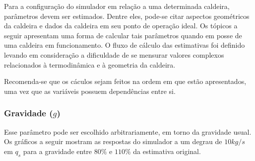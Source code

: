 Para a configuração do simulador em relação a uma determinada
caldeira, parâmetros devem ser estimados. Dentre eles, pode-se citar
aspectos geométricos da caldeira e dados da caldeira em seu ponto de
operação ideal. Os tópicos a seguir apresentam uma forma de calcular
tais parâmetros quando em posse de uma caldeira em funcionamento. O
fluxo de cálculo das estimativas foi definido levando em consideração
a dificuldade de se mensurar valores complexos relacionados à
termodinâmica e à geometria da caldeira.

Recomenda-se que os cáculos sejam feitos na ordem em que estão
apresentados, uma vez que as variáveis possuem dependências entre si.

\subsubsection{Gravidade ($g$)}

Esse parâmetro pode ser escolhido arbitrariamente, em torno da
gravidade usual. Os gráficos a seguir mostram as respostas do
simulador a um degrau de $10kg/s$ em $q_s$ para a gravidade entre
$80\%$ e $110\%$ da estimativa original.

